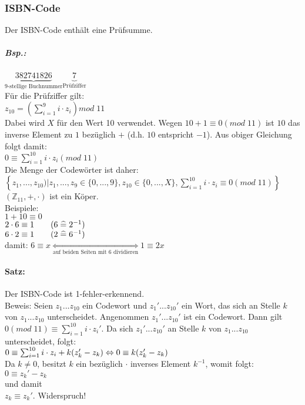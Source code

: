 \subsubsection{ISBN-Code}
Der ISBN-Code enthält eine Prüfsumme.
\subparagraph{Bsp.:} $\underbrace{382741826}_{\text{9-stellige Buchnummer}} \underbrace{7}_{\text{Prüfziffer}}$\\
Für die Prüfziffer gilt:\\
$z_{10}=\left(\sum_{i=1}^9 i\cdot z_i\right) mod\; 11$\\
Dabei wird $X$ für den Wert 10 verwendet. Wegen $10+1\equiv0 (mod\; 11)$ ist $10$ das inverse Element zu $1$ bezüglich $+$ (d.h. $10$ entspricht $-1$). Aus obiger Gleichung folgt damit:\\
$0\equiv \sum_{i=1}^{10} i\cdot z_i(mod\; 11)$\\
Die Menge der Codewörter ist daher: \\
$\left\lbrace z_1,...,z_{10})|z_1,...,z_9\in \{0,...,9\}, z_{10} \in \{0,...,X\},\sum_{i=1}^{10} i\cdot z_i\equiv 0 (mod\; 11)\right\rbrace$\\
$(\mathbb{Z}_{11},+,\cdot)$ ist ein Köper.\\
Beispiele:\\
$1+10\equiv 0$\\
$2\cdot 6 \equiv 1 \qquad (6\;\widehat{=}\; 2^{-1})$\\
$6\cdot 2 \equiv 1 \qquad (2 \;\widehat{=}\; 6^{-1})$\\
damit: $6 \equiv x \underset{\text{auf beiden Seiten mit 6 dividieren}}{\Leftrightarrow} 1 \equiv 2x$
\paragraph{Satz:} Der ISBN-Code ist 1-fehler-erkennend.\\
Beweis: Seien $z_1...z_{10}$ ein Codewort und $z_1'...z_{10}'$ ein Wort, das sich an Stelle $k$ von $z_1...z_{10}$ unterscheidet. Angenommen $z_1'...z_{10}'$ ist ein Codewort. Dann gilt $0 (mod\; 11)\equiv \sum_{i=1}^{10} i\cdot z_i'$. Da sich $z_1'...z_{10}'$ an Stelle $k$ von $z_1...z_{10}$ unterscheidet, folgt:\\
$0 \equiv \sum_{i=1}^{10} i\cdot z_i+k(z_k'-z_k) \Leftrightarrow\\
0\equiv k(z_k'-z_k)$\\
Da $k\not = 0$, besitzt $k$ ein bezüglich $\cdot$ inverses Element $k^{-1}$, womit folgt:\\
$0 \equiv z_k'-z_k$\\
und damit\\
$z_k \equiv z_k'$. Widerspruch!
